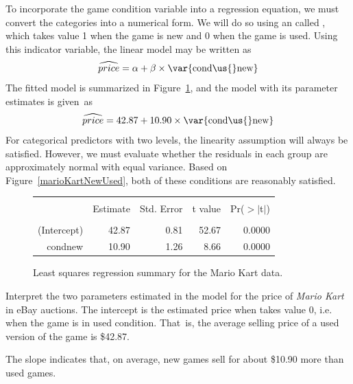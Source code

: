 To incorporate the game condition variable into a regression equation, we must convert the categories into a numerical form. We will do so using an  called , which takes value 1 when the game is new and 0 when the game is used. Using this indicator variable, the linear model may be written as
\begin{align*}
\widehat{price} = \alpha + \beta \times \text{\var{cond\us{}new}}
\end{align*}
The fitted model is summarized in Figure~\ref{marioKartNewUsedRegrSummary}, and the model with its parameter estimates is given~as
\begin{align*}
\widehat{price} = 42.87 + 10.90 \times \text{\var{cond\us{}new}}
\end{align*}
For categorical predictors with two levels, the linearity assumption will always be satisfied.
However, we must evaluate whether the residuals in each group are approximately normal with equal variance.
Based on Figure~\ref{marioKartNewUsed}, both of these conditions are reasonably satisfied.

\begin{figure}[h]
\centering
\begin{tabular}{rrrrr}
  \hline
  \vspace{-3.7mm} & & & & \\
 & Estimate & Std. Error & t value & Pr($>$$|$t$|$) \\ 
  \hline
  \vspace{-3.6mm} & & & & \\
(Intercept) & 42.87 & 0.81 & 52.67 & 0.0000 \\ 
  cond\us{}new & 10.90 & 1.26 & 8.66 & 0.0000 \\ 
   \hline
\end{tabular}
\caption{Least squares regression summary for the Mario Kart data.}
\label{marioKartNewUsedRegrSummary}
\end{figure}

\begin{examplewrap}
\begin{nexample}{Interpret the two parameters estimated in the model for the price of \emph{Mario Kart} in eBay auctions.}
The intercept is the estimated price when  takes value 0, i.e. when the game is in used condition. That~is, the average selling price of a used version of the game is \$42.87.

The slope indicates that, on average, new games sell for about \$10.90 more than used games.
\end{nexample}
\end{examplewrap}

